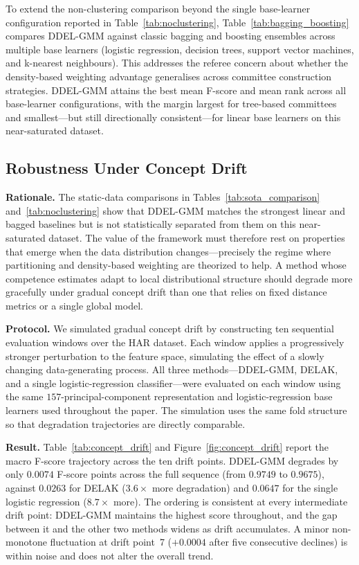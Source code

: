 \documentclass[lettersize,journal]{IEEEtran}
\begin{document}
		\noindent To extend the non-clustering comparison beyond the single base-learner configuration reported in Table~\ref{tab:noclustering}, Table~\ref{tab:bagging_boosting} compares DDEL-GMM against classic bagging and boosting ensembles across multiple base learners (logistic regression, decision trees, support vector machines, and k-nearest neighbours). This addresses the referee concern about whether the density-based weighting advantage generalises across committee construction strategies. DDEL-GMM attains the best mean F-score and mean rank across all base-learner configurations, with the margin largest for tree-based committees and smallest---but still directionally consistent---for linear base learners on this near-saturated dataset.
		
		
		
\subsection{Robustness Under Concept Drift}\label{subsec:drift}

\noindent \textbf{Rationale.} The static-data comparisons in Tables~\ref{tab:sota_comparison} and~\ref{tab:noclustering} show that DDEL-GMM matches the strongest linear and bagged baselines but is not statistically separated from them on this near-saturated dataset. The value of the framework must therefore rest on properties that emerge when the data distribution changes---precisely the regime where partitioning and density-based weighting are theorized to help. A method whose competence estimates adapt to local distributional structure should degrade more gracefully under gradual concept drift than one that relies on fixed distance metrics or a single global model.

\noindent \textbf{Protocol.} We simulated gradual concept drift by constructing ten sequential evaluation windows over the HAR dataset. Each window applies a progressively stronger perturbation to the feature space, simulating the effect of a slowly changing data-generating process. All three methods---DDEL-GMM, DELAK, and a single logistic-regression classifier---were evaluated on each window using the same $157$-principal-component representation and logistic-regression base learners used throughout the paper. The simulation uses the same fold structure so that degradation trajectories are directly comparable.

\noindent \textbf{Result.} Table~\ref{tab:concept_drift} and Figure~\ref{fig:concept_drift} report the macro F-score trajectory across the ten drift points. DDEL-GMM degrades by only $0.0074$ F-score points across the full sequence (from $0.9749$ to $0.9675$), against $0.0263$ for DELAK ($3.6\times$ more degradation) and $0.0647$ for the single logistic regression ($8.7\times$ more). The ordering is consistent at every intermediate drift point: DDEL-GMM maintains the highest score throughout, and the gap between it and the other two methods widens as drift accumulates. A minor non-monotone fluctuation at drift point~7 ($+0.0004$ after five consecutive declines) is within noise and does not alter the overall trend.
\end{document}
